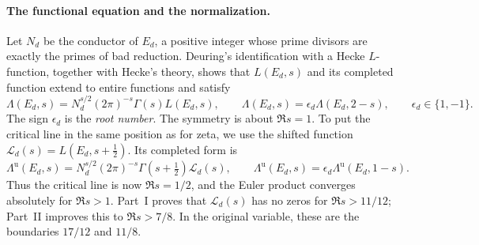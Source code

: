 \documentclass[11pt]{article}
\numberwithin{equation}{section}
\begin{document}
\paragraph{The functional equation and the normalization.}
Let $N_d$ be the conductor of $E_d$, a positive integer whose prime divisors are exactly the primes of
bad reduction. Deuring's identification with a Hecke $L$-function, together with Hecke's theory, shows
that $L(E_d,s)$ and its completed function extend to entire functions and satisfy~\cite{Deuring,Hec20}
\begin{equation}\label{eq:intro-fe}
 \Lambda(E_d,s)=N_d^{s/2}(2\pi)^{-s}\Gamma(s)L(E_d,s),\qquad
 \Lambda(E_d,s)=\epsilon_d\Lambda(E_d,2-s),\qquad \epsilon_d\in\{1,-1\}.
\end{equation}
The sign $\epsilon_d$ is the \emph{root number}. The symmetry is about $\Re s=1$.
To put the critical line in the same position as for zeta, we use the shifted function
$\mathcal L_d(s)=L(E_d,s+\frac12)$. Its completed form is
\begin{equation}\label{eq:intro-fe-u}
 \Lambda^{\mathrm u}(E_d,s)=N_d^{s/2}(2\pi)^{-s}\Gamma(s+\tfrac12)\mathcal L_d(s),
 \qquad \Lambda^{\mathrm u}(E_d,s)=\epsilon_d\Lambda^{\mathrm u}(E_d,1-s).
\end{equation}
Thus the critical line is now $\Re s=1/2$, and the Euler product converges absolutely for $\Re s>1$.
Part~I proves that $\mathcal L_d(s)$ has no zeros for $\Re s>11/12$; Part~II improves this to $\Re s>7/8$.
In the original variable, these are the boundaries $17/12$ and $11/8$.
\end{document}
